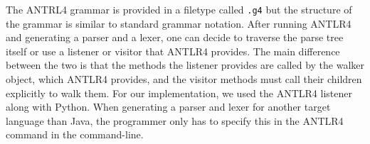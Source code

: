 The ANTRL4 grammar is provided in a filetype called \texttt{.g4} but the structure of the grammar is similar to standard grammar notation.
After running ANTLR4 and generating a parser and a lexer, one can decide to traverse the parse tree itself or use a listener or visitor that ANTLR4 provides. The main difference between the two is that the methods the listener provides are called by the walker object, which ANTLR4 provides, and the visitor methods must call their children explicitly to walk them.
For our implementation, we used the ANTLR4 listener along with Python. When generating a parser and lexer for another target language than Java, the programmer only has to specify this in the ANTLR4 command in the command-line.

